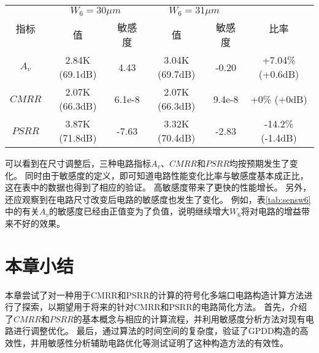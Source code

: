 \begin{table}[!htp]
	\centering
	\begin{tabular}{c|c|c|c|c|c}
		\hline
		\multirow{2}{*}{指标} & \multicolumn{2}{c|}{$W_6=30\mu m$} & \multicolumn{2}{c|}{$W_6=31\mu m$} & \multirow{2}{*}{比率} \\ \cline{2-5}
		                    &       值        &        敏感度        &       值        &        敏感度        &  \\ \hline
		       $A_v$        & 2.84K (69.1dB) &       4.43        & 3.04K (69.7dB) &       -0.20       &  +7.04\% (+0.6dB)   \\ \hline
		      $CMRR$        & 2.07K (66.3dB) &      6.1e-8       & 2.07K (66.3dB) &      9.4e-8       &     +0\% (+0dB)     \\ \hline
		      $PSRR$        & 3.87K (71.8dB) &       -7.63       & 3.32K (70.4dB) &       -2.83       &  -14.2\% (-1.4dB)   \\ \hline
	\end{tabular}
\end{table}

可以看到在尺寸调整后，三种电路指标$A_v$、$CMRR$和$PSRR$均按预期发生了变化。
同时由于敏感度的定义，即可知道电路性能变化比率与敏感度基本成正比，这在表中的数据也得到了相应的验证。
高敏感度带来了更快的性能增长。
另外，还应观察到在电路尺寸改变后电路的敏感度也发生了变化。
例如，表\ref{tab:sensw6}中的有关$A_v$的敏感度已经由正值变为了负值，说明继续增大$W_6$将对电路的增益带来不好的效果。

\section{本章小结}

本章尝试了对一种用于CMRR和PSRR的计算的符号化多端口电路构造计算方法进行了探索，以期望用于将来的针对CMRR和PSRR的电路简化方法。
首先，介绍了$CMRR$和$PSRR$的基本概念与相应的计算流程，并利用敏感度分析方法对现有电路进行调整优化。
最后，通过算法的时间空间的复杂度，验证了GPDD构造的高效性，并用敏感性分析辅助电路优化等测试证明了这种构造方法的有效性。